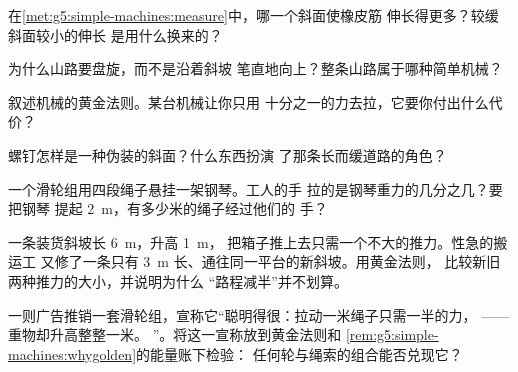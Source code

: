 \begin{exercise}[$\star$]\label{exo:g5:simple-machines:5}
在\cref{met:g5:simple-machines:measure}中，哪一个斜面使橡皮筋
伸长得更多？较缓斜面较小的伸长
是用什么换来的？
\end{exercise}

\begin{exercise}[$\star$]\label{exo:g5:simple-machines:6}
为什么山路要盘旋，而不是沿着斜坡
笔直地向上？整条山路属于哪种简单机械？
\end{exercise}

\begin{exercise}[$\star$]\label{exo:g5:simple-machines:7}
叙述机械的黄金法则。某台机械让你只用
十分之一的力去拉，它要你付出什么代价？
\end{exercise}

\begin{exercise}[$\star$]\label{exo:g5:simple-machines:8}
螺钉怎样是一种伪装的斜面？什么东西扮演
了那条长而缓道路的角色？
\end{exercise}

\begin{exercise}[$\star\star$]\label{exo:g5:simple-machines:9}
一个滑轮组用四段绳子悬挂一架钢琴。工人的手
拉的是钢琴重力的几分之几？要把钢琴
提起 \qty{2}{m}，有多少米的绳子经过他们的
手？
\end{exercise}

\begin{exercise}[$\star\star$]\label{exo:g5:simple-machines:10}
一条装货斜坡长 \qty{6}{m}，升高 \qty{1}{m}，
把箱子推上去只需一个不大的推力。性急的搬运工
又修了一条只有 \qty{3}{m} 长、通往同一平台的新斜坡。用黄金法则，
比较新旧两种推力的大小，并说明为什么
“路程减半”并不划算。
\end{exercise}

\begin{exercise}[$\star\star$]\label{exo:g5:simple-machines:11}
一则广告推销一套滑轮组，宣称它“聪明得很：拉动一米绳子只需一半的力，
——重物却升高整整一米。
”。将这一宣称放到黄金法则和
\cref{rem:g5:simple-machines:whygolden}的能量账下检验：
任何轮与绳索的组合能否兑现它？
\end{exercise}
